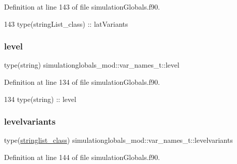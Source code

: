 Definition at line 143 of file simulation\+Globals.\+f90.


\begin{DoxyCode}
143         \textcolor{keywordtype}{type}(stringList\_class) :: latVariants
\end{DoxyCode}
\mbox{\label{structsimulationglobals__mod_1_1var__names__t_a1dc8ae36a22bfd43a9f1fd7e2d13548a}} 
\subsubsection{\texorpdfstring{level}{level}}
{\footnotesize\ttfamily type(string) simulationglobals\+\_\+mod\+::var\+\_\+names\+\_\+t\+::level\hspace{0.3cm}{\ttfamily [private]}}



Definition at line 134 of file simulation\+Globals.\+f90.


\begin{DoxyCode}
134         \textcolor{keywordtype}{type}(string) :: level
\end{DoxyCode}
\mbox{\label{structsimulationglobals__mod_1_1var__names__t_a1995369a3480af51e624771301419238}} 
\subsubsection{\texorpdfstring{levelvariants}{levelvariants}}
{\footnotesize\ttfamily type(\mbox{\hyperlink{structsimulationglobals__mod_1_1stringlist__class}{stringlist\+\_\+class}}) simulationglobals\+\_\+mod\+::var\+\_\+names\+\_\+t\+::levelvariants\hspace{0.3cm}{\ttfamily [private]}}



Definition at line 144 of file simulation\+Globals.\+f90.


